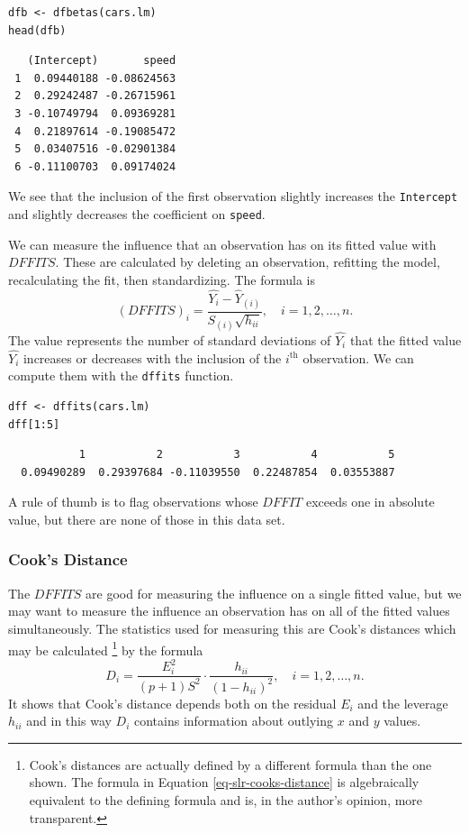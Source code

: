 \documentclass[captions=tableheading]{scrbook}
\begin{document}
\lstset{language=R}
\begin{lstlisting}
dfb <- dfbetas(cars.lm)
head(dfb)
\end{lstlisting}

\begin{verbatim}
   (Intercept)       speed
 1  0.09440188 -0.08624563
 2  0.29242487 -0.26715961
 3 -0.10749794  0.09369281
 4  0.21897614 -0.19085472
 5  0.03407516 -0.02901384
 6 -0.11100703  0.09174024
\end{verbatim}

We see that the inclusion of the first observation slightly increases the \texttt{Intercept} and slightly decreases the coefficient on \texttt{speed}.

We can measure the influence that an observation has on its fitted value with \(DFFITS\). These are calculated by deleting an observation, refitting the model, recalculating the fit, then standardizing. The formula is 
\begin{equation}
(DFFITS)_{i}=\frac{\hat{Y_{i}}-\hat{Y}_{(i)}}{S_{(i)}\sqrt{h_{ii}}},\quad i=1,2,\ldots,n.
\end{equation}
The value represents the number of standard deviations of \(\hat{Y_{i}}\) that the fitted value \(\hat{Y_{i}}\) increases or decreases with the inclusion of the \(i^{\textrm{th}}\) observation. We can compute them with the \texttt{dffits} function.


\lstset{language=R}
\begin{lstlisting}
dff <- dffits(cars.lm)
dff[1:5]
\end{lstlisting}

\begin{verbatim}
           1           2           3           4           5 
  0.09490289  0.29397684 -0.11039550  0.22487854  0.03553887
\end{verbatim}

A rule of thumb is to flag observations whose \(DFFIT\) exceeds one in absolute value, but there are none of those in this data set.
\subsubsection{Cook's Distance}
\label{sec-11-5-4-2}


The \(DFFITS\) are good for measuring the influence on a single fitted value, but we may want to measure the influence an observation has on all of the fitted values simultaneously. The statistics used for measuring this are Cook's distances which may be calculated
\footnote{Cook's distances are actually defined by a different formula than the one shown. The formula in Equation \ref{eq-slr-cooks-distance} is algebraically equivalent to the defining formula and is, in the author's opinion, more transparent.}
by the formula
\begin{equation}
D_{i}=\frac{E_{i}^{2}}{(p+1)S^{2}}\cdot\frac{h_{ii}}{(1-h_{ii})^{2}},\quad i=1,2,\ldots,n.\label{eq-slr-cooks-distance}
\end{equation}
It shows that Cook's distance depends both on the residual \(E_{i}\) and the leverage \(h_{ii}\) and in this way \(D_{i}\) contains information about outlying \(x\) and \(y\) values.
\end{document}
